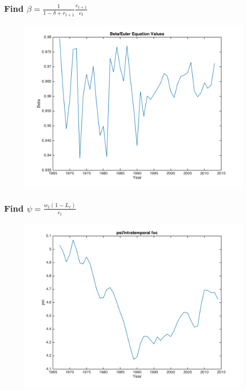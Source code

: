 \documentclass{beamer}
\begin{document}
\begin{frame}
\frametitle[alignment=center]{Find $\beta=\frac{1}{1-\delta+r_{t+1}}\frac{c_{t+1}}{c_t}$}
\begin{figure}
\centering
\includegraphics[scale=0.5]{Figure_5.png}
\end{figure}
\end{frame}

\begin{frame}
\frametitle[alignment=center]{Find $\psi=\frac{w_t(1-L_t)}{c_t}$}
\begin{figure}
\centering
\includegraphics[scale=0.5]{Figure_6.png}
\end{figure}
\end{frame}
\end{document}
